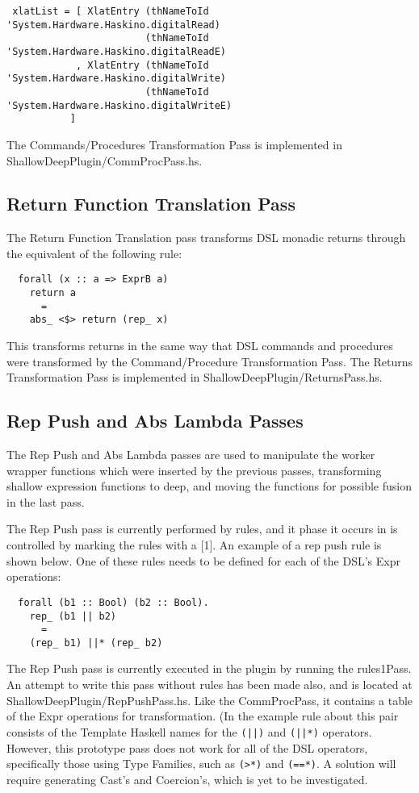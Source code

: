 \documentclass[11pt, oneside]{article}   	%
\begin{document}
\begin{verbatim}
 xlatList = [ XlatEntry (thNameToId 'System.Hardware.Haskino.digitalRead)
                        (thNameToId 'System.Hardware.Haskino.digitalReadE)
            , XlatEntry (thNameToId 'System.Hardware.Haskino.digitalWrite)
                        (thNameToId 'System.Hardware.Haskino.digitalWriteE)
           ]
\end{verbatim}

The Commands/Procedures Transformation Pass is implemented in ShallowDeepPlugin/CommProcPass.hs.

\subsection{Return Function Translation Pass}

The Return Function Translation pass transforms DSL monadic returns through
the equivalent of the following rule:

\begin{verbatim}
  forall (x :: a => ExprB a)
    return a
      =
    abs_ <$> return (rep_ x)
\end{verbatim}

This transforms returns in the same way that DSL commands and procedures
were transformed by the Command/Procedure Transformation Pass.
The Returns Transformation Pass is implemented in ShallowDeepPlugin/ReturnsPass.hs.

\subsection{Rep Push and Abs Lambda Passes}

The Rep Push and Abs Lambda passes are used to manipulate the worker
wrapper functions which were inserted by the previous passes, transforming
shallow expression functions to deep, and moving the functions for
possible fusion in the last pass.

The Rep Push pass is currently performed by rules, and it phase it occurs in
is controlled by marking the rules with a [1].  An example of a rep push rule
is shown below.  One of these rules needs to be defined for each of the DSL's
Expr operations:

\begin{verbatim}
  forall (b1 :: Bool) (b2 :: Bool).
    rep_ (b1 || b2)
      =
    (rep_ b1) ||* (rep_ b2)
\end{verbatim}

The Rep Push pass is currently executed in the plugin by running the rules1Pass. 
An attempt to write this pass without rules has been made also, and is
located at ShallowDeepPlugin/RepPushPass.hs.  Like the CommProcPass,
it contains a table of the Expr operations for transformation.  (In the example 
rule about this pair consists of the Template Haskell names for the \verb+(||)+ and \verb+(||*)+
operators.  However, this prototype pass does not work for all of the DSL 
operators, specifically those using Type Families, such as \verb+(>*)+ and \verb+(==*)+.
A solution will require generating Cast's and Coercion's, which is yet to
be investigated.
\end{document}

